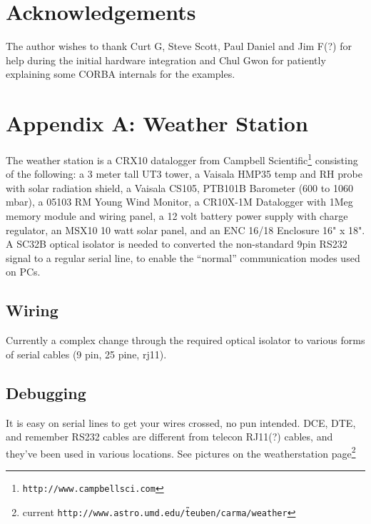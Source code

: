 \documentclass[11pt]{article}
\begin{document}


\section*{Acknowledgements}

The author wishes to thank Curt G, Steve Scott, Paul Daniel and Jim F(?) 
for help during the initial hardware integration and Chul Gwon for
patiently explaining some CORBA internals for the examples.


\newpage
\section{Appendix A: Weather Station}

The weather station is a CRX10 datalogger from
Campbell Scientific\footnote{{\tt http://www.campbellsci.com}}
consisting of the following: a 3 meter tall UT3 tower, a Vaisala HMP35 temp and RH probe with 
solar radiation shield, a Vaisala CS105, PTB101B Barometer (600 to 1060 
mbar), a 05103 RM Young Wind Monitor, a CR10X-1M Datalogger with 1Meg 
memory module and wiring panel, a 12 volt battery power supply with 
charge regulator, an MSX10 10 watt solar panel, and an ENC 16/18 
Enclosure 16" x 18". A SC32B optical isolator is needed to converted
the non-standard 9pin RS232 signal to a regular serial line, to enable
the ``normal'' communication modes used on PCs.

\subsection{Wiring}

Currently a complex change through the required optical isolator to
various forms of serial cables (9 pin, 25 pine, rj11).

\subsection{Debugging}

It is easy on serial lines to get your wires crossed, no pun intended. DCE, DTE, and 
remember RS232 cables are different from telecon RJ11(?) cables, and they've been
used in various locations. See pictures on the 
weatherstation page\footnote{current {\tt http://www.astro.umd.edu/\~ teuben/carma/weather}}
\end{document}
